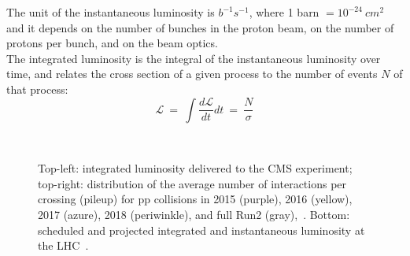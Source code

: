 The unit of the instantaneous luminosity is $b^{-1}s^{-1}$, where 1
barn $= 10^{-24} \ cm^2$ and it depends on the number of bunches in
the proton beam, on the number of protons per bunch, and on the beam
optics. \\
The integrated luminosity is the integral of the instantaneous
luminosity over time, and relates the cross section of a
given process to the number of events $N$ of that process:
\begin{equation}
\label{eq:intelumi}
\mathcal{L} \:=\: \int \frac{d\mathcal{L}}{dt} dt \: = \: \frac{N}{\sigma}
\end{equation}


\begin{figure}[h]
  \noindent
  \\
  \caption{Top-left: integrated luminosity delivered to the CMS
    experiment; top-right: distribution of the average number of
    interactions per crossing (pileup) for pp collisions in 2015
    (purple), 2016 (yellow), 2017 (azure), 2018 (periwinkle), and
    full Run2 (gray),~\cite{webpage_lumi}. Bottom: scheduled and
    projected integrated and instantaneous luminosity at the LHC~\cite{webpage_lhc}.}
  \label{fig:lumi}
\end{figure}

